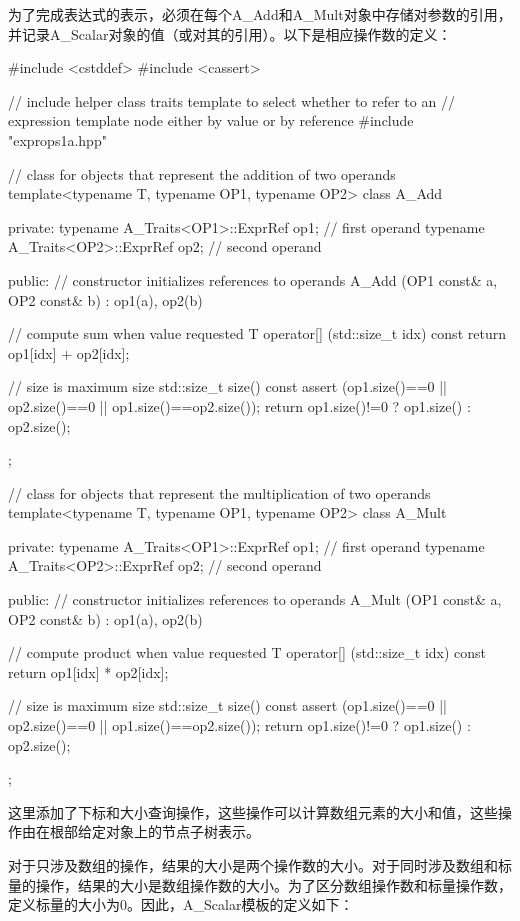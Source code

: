 为了完成表达式的表示，必须在每个A\_Add和A\_Mult对象中存储对参数的引用，并记录A\_Scalar对象的值（或对其的引用）。以下是相应操作数的定义：

\begin{cpp}
#include <cstddef>
#include <cassert>

// include helper class traits template to select whether to refer to an
// expression template node either by value or by reference
#include "exprops1a.hpp"

// class for objects that represent the addition of two operands
template<typename T, typename OP1, typename OP2>
class A_Add {
	private:
	typename A_Traits<OP1>::ExprRef op1; // first operand
	typename A_Traits<OP2>::ExprRef op2; // second operand
	
	public:
	// constructor initializes references to operands
	A_Add (OP1 const& a, OP2 const& b)
	: op1(a), op2(b) {
	}

	// compute sum when value requested
	T operator[] (std::size_t idx) const {
		return op1[idx] + op2[idx];
	}

	// size is maximum size
	std::size_t size() const {
		assert (op1.size()==0 || op2.size()==0
		|| op1.size()==op2.size());
		return op1.size()!=0 ? op1.size() : op2.size();
	}
};

// class for objects that represent the multiplication of two operands
template<typename T, typename OP1, typename OP2>
class A_Mult {
	private:
	typename A_Traits<OP1>::ExprRef op1; // first operand
	typename A_Traits<OP2>::ExprRef op2; // second operand
	
	public:
	// constructor initializes references to operands
	A_Mult (OP1 const& a, OP2 const& b)
	: op1(a), op2(b) {
	}

	// compute product when value requested
	T operator[] (std::size_t idx) const {
		return op1[idx] * op2[idx];
	}

	// size is maximum size
	std::size_t size() const {
		assert (op1.size()==0 || op2.size()==0
		|| op1.size()==op2.size());
		return op1.size()!=0 ? op1.size() : op2.size();
	}
};
\end{cpp}

这里添加了下标和大小查询操作，这些操作可以计算数组元素的大小和值，这些操作由在根部给定对象上的节点子树表示。

对于只涉及数组的操作，结果的大小是两个操作数的大小。对于同时涉及数组和标量的操作，结果的大小是数组操作数的大小。为了区分数组操作数和标量操作数，定义标量的大小为0。因此，A\_Scalar模板的定义如下：


